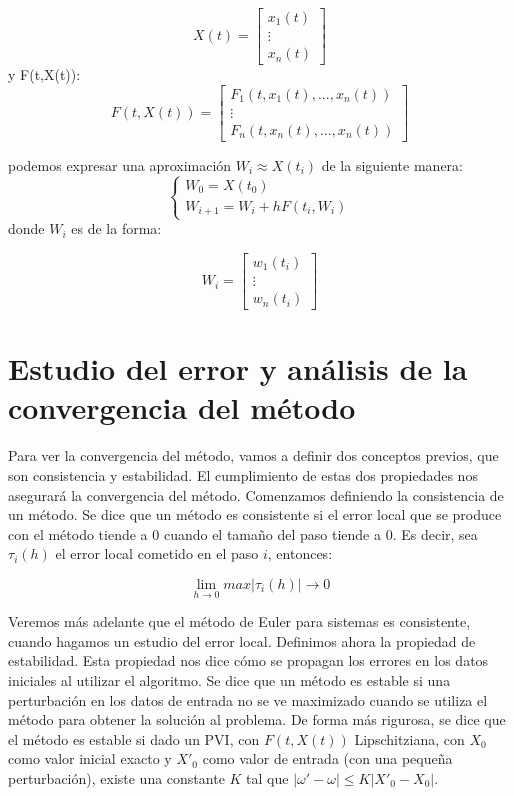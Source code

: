 \documentclass[12pt]{article}       %
\begin{document}
\begin{equation*}
X(t)=\begin{bmatrix}
	x_1(t) \\
	\vdots \\
	x_n(t)
	\end{bmatrix}
\end{equation*}
y F(t,X(t)):
\begin{equation*}
F(t,X(t))=\begin{bmatrix}
F_1(t,x_1(t),...,x_n(t)) \\
\vdots \\
F_n(t,x_n(t),...,x_n(t))
\end{bmatrix}
\end{equation*}

podemos expresar una aproximación $W_i \approx X(t_i)$ de la siguiente manera:
$$
\begin{cases}
W_0=X(t_0)\\
W_{i+1}=W_i + hF(t_i,W_i)
\end{cases}
$$
donde $W_i$ es de la forma:

\begin{equation*}
W_i=\begin{bmatrix}
w_1(t_i) \\
\vdots \\
w_n(t_i)
\end{bmatrix}
\end{equation*}

\section{Estudio del error y análisis de la convergencia del método}

Para ver la convergencia del método, vamos a definir dos conceptos previos, que son consistencia y estabilidad. El cumplimiento de estas dos propiedades nos asegurará la convergencia del método. Comenzamos definiendo la consistencia de un método. Se dice que un método es consistente si el error local que se produce con el método tiende a 0 cuando el tamaño del paso tiende a 0. Es decir, sea $\tau_i(h)$ el error local cometido en el paso $i$, entonces:

$$ \lim_{h \rightarrow 0} max | \tau_i(h) | \rightarrow 0 $$

Veremos más adelante que el método de Euler para sistemas es consistente, cuando hagamos un estudio del error local. Definimos ahora la propiedad de estabilidad. Esta propiedad nos dice cómo se propagan los errores en los datos iniciales al utilizar el algoritmo. Se dice que un método es estable si una perturbación en los datos de entrada no se ve maximizado cuando se utiliza el método para obtener la solución al problema. De forma más rigurosa, se dice que el método es estable si dado un PVI, con $F(t, X(t))$ Lipschitziana, con $X_0$ como valor inicial exacto y $X'_0$ como valor de entrada (con una pequeña perturbación), existe una constante $K$ tal que $|\omega' - \omega| \leq K|X'_0 - X_0|$.\\
\end{document}
